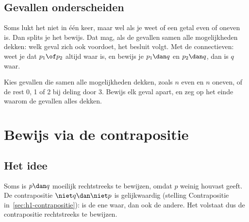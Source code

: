\subsection{Gevallen onderscheiden}

Soms lukt het niet in één keer, maar wel als je weet of een getal even of oneven is. Dan splits je het bewijs. Dat mag, als de gevallen samen alle mogelijkheden dekken: welk geval zich ook voordoet, het besluit volgt. Met de connectieven: weet je dat $p_1 \of p_2$ altijd waar is, en bewijs je $p_1 \dan q$ en $p_2 \dan q$, dan is $q$ waar.


\begin{werkwijze}
Kies gevallen die samen alle mogelijkheden dekken, zoals $n$ even en $n$ oneven, of de rest 0, 1 of 2 bij deling door 3. Bewijs elk geval apart, en zeg op het einde waarom de gevallen alles dekken.
\end{werkwijze}

\begin{oefeningen}
\end{oefeningen}

\section{Bewijs via de contrapositie}\label{sec:h2-contrapositie}

\subsection{Het idee}

Soms is $p \dan q$ moeilijk rechtstreeks te bewijzen, omdat $p$ weinig houvast geeft. De contrapositie $\niet q \dan \niet p$ is gelijkwaardig (stelling Contrapositie in~\ref{sec:h1-contrapositie}): is de ene waar, dan ook de andere. Het volstaat dus de contrapositie rechtstreeks te bewijzen.

